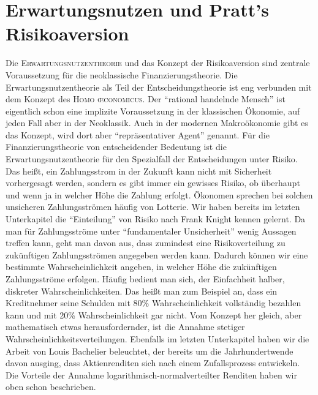 \section{Erwartungsnutzen und Pratt's Risikoaversion}
\label{Erwartungsnutzen}
Die \textsc{Erwartungsnutzentheorie} und das Konzept der Risikoaversion sind zentrale Voraussetzung für die neoklassische Finanzierungstheorie. Die Erwartungsnutzentheorie als Teil der Entscheidungstheorie ist eng verbunden mit dem Konzept des \textsc{Homo \oe conomicus}. Der "`rational handelnde Mensch"' ist eigentlich schon eine implizite Voraussetzung in der klassischen Ökonomie, auf jeden Fall aber in der Neoklassik. Auch in der modernen Makroökonomie gibt es das Konzept, wird dort aber "`repräsentativer Agent"' genannt. Für die Finanzierungstheorie von entscheidender Bedeutung ist die Erwartungsnutzentheorie für den Spezialfall der Entscheidungen unter Risiko. Das heißt, ein Zahlungsstrom in der Zukunft kann nicht mit Sicherheit vorhergesagt werden, sondern es gibt immer ein gewisses Risiko, ob überhaupt und wenn ja in welcher Höhe die Zahlung erfolgt. Ökonomen sprechen bei solchen unsicheren Zahlungsströmen häufig von Lotterie. Wir haben bereits im letzten Unterkapitel die "`Einteilung"' von Risiko nach Frank Knight kennen gelernt. Da man für Zahlungsströme unter "`fundamentaler Unsicherheit"' wenig Aussagen treffen kann, geht man davon aus, dass zumindest eine Risikoverteilung zu zukünftigen Zahlungsströmen angegeben werden kann. Dadurch können wir eine bestimmte Wahrscheinlichkeit angeben, in welcher Höhe die zukünftigen Zahlungsströme erfolgen. Häufig bedient man sich, der Einfachheit halber, diskreter Wahrscheinlichkeiten. Das heißt man zum Beispiel an, dass ein Kreditnehmer seine Schulden mit 80\% Wahrscheinlichkeit vollständig bezahlen kann und mit 20\% Wahrscheinlichkeit gar nicht. Vom Konzept her gleich, aber mathematisch etwas herausfordernder, ist die Annahme stetiger Wahrscheinlichkeitsverteilungen. Ebenfalls im letzten Unterkapitel haben wir die Arbeit von Louis Bachelier beleuchtet, der bereits um die Jahrhundertwende davon ausging, dass Aktienrenditen sich nach einem Zufallsprozess entwickeln. Die Vorteile der Annahme logarithmisch-normalverteilter Renditen haben wir oben schon beschrieben. 

